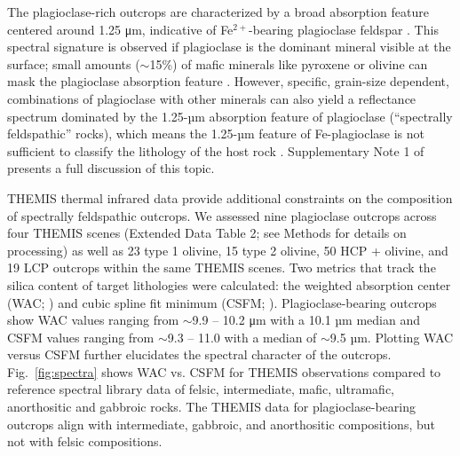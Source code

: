 \documentclass[12pt]{article}
\begin{document}
The plagioclase-rich outcrops are characterized by a broad absorption feature centered around 1.25 μm, indicative of Fe$^{2+}$-bearing plagioclase feldspar \citep{Adams1967, Adams1973, Adams1978}. This spectral signature is observed if plagioclase is the dominant mineral visible at the surface; small amounts ($\sim$15\%) of mafic minerals like pyroxene or olivine can mask the plagioclase absorption feature \citep{Crown1987, Pompilio2007, Serventi2013, Serventi2015, Cheek2014}. However, specific, grain-size dependent, combinations of plagioclase with other minerals can also yield a reflectance spectrum dominated by the 1.25-µm absorption feature of plagioclase (``spectrally feldspathic'' rocks), which means the 1.25-µm feature of Fe-plagioclase is not sufficient to classify the lithology of the host rock \citep{Rogers2015, Barthez2023, Vannier2024}. Supplementary Note 1 of \citet{Phillips2022} presents a full discussion of this topic.

THEMIS thermal infrared data provide additional constraints on the composition of spectrally feldspathic outcrops. We assessed nine plagioclase outcrops across four THEMIS scenes (Extended Data Table 2; see Methods for details on processing) as well as 23 type 1 olivine, 15 type 2 olivine, 50 HCP + olivine, and 19 LCP outcrops within the same THEMIS scenes. Two metrics that track the silica content of target lithologies were calculated: the weighted absorption center (WAC; \citealt{Smith2013, Amador2016}) and cubic spline fit minimum (CSFM; \citealt{Rogers2015}). Plagioclase-bearing outcrops show WAC values ranging from $\sim$9.9 -- 10.2 μm with a 10.1 µm median and CSFM values ranging from $\sim$9.3 -- 11.0 with a median of $\sim$9.5 µm. Plotting WAC versus CSFM further elucidates the spectral character of the outcrops. Fig.~\ref{fig:spectra} shows WAC vs. CSFM for THEMIS observations compared to reference spectral library data of felsic, intermediate, mafic, ultramafic, anorthositic and gabbroic rocks. The THEMIS data for plagioclase-bearing outcrops align with intermediate, gabbroic, and anorthositic compositions, but not with felsic compositions.
\end{document}
